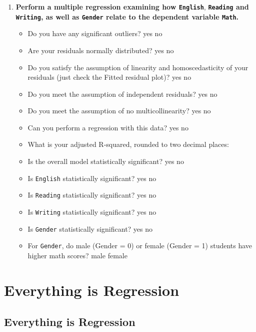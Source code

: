 \documentclass[
]{book}
\begin{document}
\begin{enumerate}
\def\labelenumi{\arabic{enumi}.}
\item
  \textbf{Perform a multiple regression examining how \texttt{English}}, \textbf{\texttt{Reading} and \texttt{Writing}, as well as \texttt{Gender} relate to the dependent variable \texttt{Math}.}

  \begin{itemize}
  \item
    Do you have any significant outliers? yes no
  \item
    Are your residuals normally distributed? yes no
  \item
    Do you satisfy the assumption of linearity and homoscedasticity of your residuals (just check the Fitted residual plot)? yes no
  \item
    Do you meet the assumption of independent residuals? yes no
  \item
    Do you meet the assumption of no multicollinearity? yes no
  \item
    Can you perform a regression with this data? yes no
  \item
    What is your adjusted R-squared, rounded to two decimal places:
  \item
    Is the overall model statistically significant? yes no
  \item
    Is \texttt{English} statistically significant? yes no
  \item
    Is \texttt{Reading} statistically significant? yes no
  \item
    Is \texttt{Writing} statistically significant? yes no
  \item
    Is \texttt{Gender} statistically significant? yes no
  \item
    For \texttt{Gender}, do male (Gender = 0) or female (Gender = 1) students have higher math scores? male female
  \end{itemize}
\end{enumerate}

\hypertarget{everything-is-regression}{%
\chapter{Everything is Regression}\label{everything-is-regression}}

\hypertarget{everything-is-regression-1}{%
\section{Everything is Regression}\label{everything-is-regression-1}}
\end{document}
